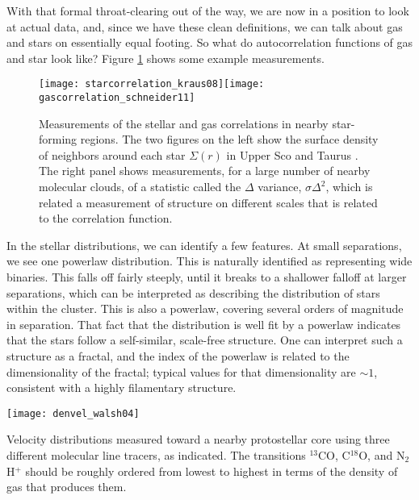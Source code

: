 With that formal throat-clearing out of the way, we are now in a position to look at actual data, and, since we have these clean definitions, we can talk about gas and stars on essentially equal footing. So what do autocorrelation functions of gas and star look like? Figure \ref{fig:correlation_stargas} shows some example measurements.

\begin{figure}
\texttt{[image: starcorrelation\_kraus08]}\texttt{[image: gascorrelation\_schneider11]}
\caption[Correlation functions for gas and stars]{
\label{fig:correlation_stargas}
Measurements of the stellar and gas correlations in nearby star-forming regions. The two figures on the left show the surface density of neighbors around each star $\Sigma(r)$ in Upper Sco and Taurus \citep{kraus08a}. The right panel shows measurements, for a large number of nearby molecular clouds, of a statistic called the $\Delta$ variance, $\sigma \Delta^2$, which is related a measurement of structure on different scales that is related to the correlation function.
}
\end{figure}

In the stellar distributions, we can identify a few features. At small separations, we see one powerlaw distribution. This is naturally identified as representing wide binaries. This falls off fairly steeply, until it breaks to a shallower falloff at larger separations, which can be interpreted as describing the distribution of stars within the cluster. This is also a powerlaw, covering several orders of magnitude in separation. That fact that the distribution is well fit by a powerlaw indicates that the stars follow a self-similar, scale-free structure. One can interpret such a structure as a fractal, and the index of the powerlaw is related to the dimensionality of the fractal; typical values for that dimensionality are $\sim 1$, consistent with a highly filamentary structure.

\begin{marginfigure}
\texttt{[image: denvel\_walsh04]}
\caption[Velocity distributions in varying molecular lines]{
\label{fig:denvel_walsh04}
Velocity distributions measured toward a nearby protostellar core using three different molecular line tracers, as indicated. The transitions $^{13}$CO, C$^{18}$O, and N$_2$H$^+$ should be roughly ordered from lowest to highest in terms of the density of gas that produces them.
}
\end{marginfigure}

